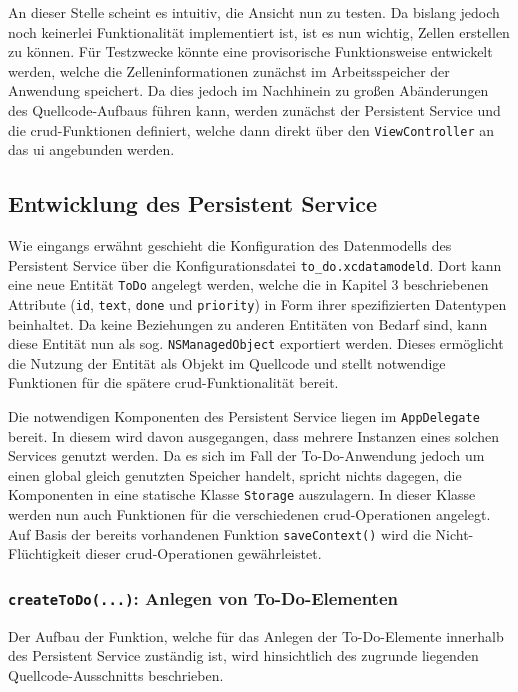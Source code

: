 An dieser Stelle scheint es intuitiv, die Ansicht nun zu testen. Da bislang jedoch noch keinerlei Funktionalität implementiert ist, ist es nun wichtig, Zellen erstellen zu können. Für Testzwecke könnte eine provisorische Funktionsweise entwickelt werden, welche die Zelleninformationen zunächst im Arbeitsspeicher der Anwendung speichert. Da dies jedoch im Nachhinein zu großen Abänderungen des Quellcode-Aufbaus führen kann, werden zunächst der Persistent Service und die \ac{crud}-Funktionen definiert, welche dann direkt über den \texttt{ViewController} an das \ac{ui} angebunden werden.

\subsection{Entwicklung des Persistent Service} \label{chap:ios_persistent_service}
Wie eingangs erwähnt geschieht die Konfiguration des Datenmodells des Persistent Service über die Konfigurationsdatei \texttt{to\_do.xcdatamodeld}. Dort kann eine neue Entität \texttt{ToDo} angelegt werden, welche die in Kapitel 3 beschriebenen Attribute (\texttt{id}, \texttt{text}, \texttt{done} und \texttt{priority}) in Form ihrer spezifizierten Datentypen beinhaltet. Da keine Beziehungen zu anderen Entitäten von Bedarf sind, kann diese Entität nun als sog. \texttt{NSManagedObject} exportiert werden. Dieses ermöglicht die Nutzung der Entität als Objekt im Quellcode und stellt notwendige Funktionen für die spätere \ac{crud}-Funktionalität bereit.

Die notwendigen Komponenten des Persistent Service liegen im \texttt{AppDelegate} bereit. In diesem wird davon ausgegangen, dass mehrere Instanzen eines solchen Services genutzt werden. Da es sich im Fall der To-Do-Anwendung jedoch um einen global gleich genutzten Speicher handelt, spricht nichts dagegen, die Komponenten in eine statische Klasse \texttt{Storage} auszulagern. In dieser Klasse werden nun auch Funktionen für die verschiedenen \ac{crud}-Operationen angelegt. Auf Basis der bereits vorhandenen Funktion \texttt{saveContext()} wird die Nicht-Flüchtigkeit dieser \ac{crud}-Operationen gewährleistet.

\subsubsection{\texttt{createToDo(...)}: Anlegen von To-Do-Elementen}
Der Aufbau der Funktion, welche für das Anlegen der To-Do-Elemente innerhalb des Persistent Service zuständig ist, wird hinsichtlich des zugrunde liegenden Quellcode-Ausschnitts beschrieben.


